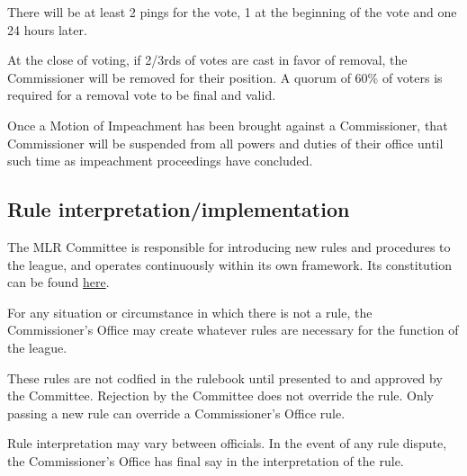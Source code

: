 \begin{deepEnumerate}
\begin{deepEnumerate}
\begin{deepEnumerate}
			There will be at least 2 pings for the vote, 1 at the beginning of the vote and one 24 hours later.
			\item At the close of voting, if 2/3rds of votes are cast in favor of removal, the Commissioner will be removed for their position. 
			A quorum of 60\% of voters is required for a removal vote to be final and valid.
		\end{deepEnumerate}
		\item Once a Motion of Impeachment has been brought against a Commissioner, that Commissioner will be suspended from all powers and duties of their office 
		until such time as impeachment proceedings have concluded.
	\end{deepEnumerate}
\end{deepEnumerate}

\subsection{Rule interpretation/implementation}
\begin{deepEnumerate}
	\item The MLR Committee is responsible for introducing new rules and procedures to the league, and operates continuously within its own framework.
	Its constitution can be found \hyperref[sec:Committee Constitution]{here}.
	\item For any situation or circumstance in which there is not a rule, the Commissioner's Office may create whatever rules are necessary
	for the function of the league.
	\begin{deepEnumerate}
		\item These rules are not codfied in the rulebook until presented to and approved by the Committee.
		Rejection by the Committee does not override the rule. Only passing a new rule can override a Commissioner's Office rule.
	\end{deepEnumerate}
	\item Rule interpretation may vary between officials. In the event of any rule dispute, the Commissioner’s Office has final say in the interpretation of the rule.
\end{deepEnumerate}

